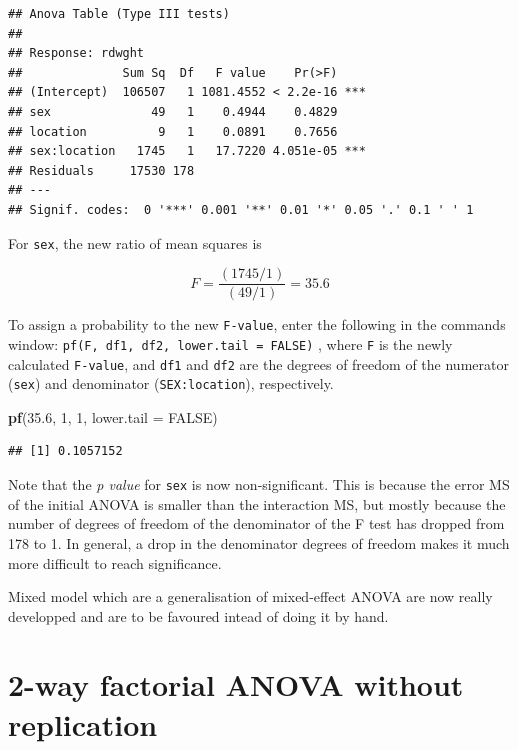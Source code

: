 \documentclass[
  12pt,
]{book}
\makeatletter
\newenvironment{Shaded}{\begin{snugshade}}{\end{snugshade}}
\newcommand{\DataTypeTok}[1]{\textcolor[rgb]{0.13,0.29,0.53}{#1}}
\newcommand{\DecValTok}[1]{\textcolor[rgb]{0.00,0.00,0.81}{#1}}
\newcommand{\FloatTok}[1]{\textcolor[rgb]{0.00,0.00,0.81}{#1}}
\newcommand{\KeywordTok}[1]{\textcolor[rgb]{0.13,0.29,0.53}{\textbf{#1}}}
\newcommand{\NormalTok}[1]{#1}
\newcommand{\OtherTok}[1]{\textcolor[rgb]{0.56,0.35,0.01}{#1}}
\newenvironment{kframe}{%
\medskip{}
\setlength{\fboxsep}{.8em}
\def\at@end@of@kframe{}%
\ifinner\ifhmode%
 \def\at@end@of@kframe{\end{minipage}}%
 \begin{minipage}{\columnwidth}%
\fi\fi%
\def\FrameCommand##1{\hskip\@totalleftmargin \hskip-\fboxsep
\colorbox{incolor}{##1}\hskip-\fboxsep
    \hskip-\linewidth \hskip-\@totalleftmargin \hskip\columnwidth}%
\MakeFramed {\advance\hsize-\width
  \@totalleftmargin\z@ \linewidth\hsize
  \@setminipage}}%
{\par\unskip\endMakeFramed%
\at@end@of@kframe}
\newenvironment{rmdblock}[1]
 {
 \begin{itemize}
 \renewcommand{\labelitemi}{
   \raisebox{-.7\height}[0pt][0pt]{
     {\setkeys{Gin}{width=3em,keepaspectratio}\texttt{[image: images/\#1]}}
   }
 }
 \begin{kframe}
 \setlength{\fboxsep}{1em}
 \item
 }
 {
 \end{kframe}
 \end{itemize}
 }
\newenvironment{rmdnote}
  {\begin{rmdblock}{note}}
  {\end{rmdblock}}
\makeatother
\begin{document}
\begin{verbatim}
## Anova Table (Type III tests)
## 
## Response: rdwght
##              Sum Sq  Df   F value    Pr(>F)    
## (Intercept)  106507   1 1081.4552 < 2.2e-16 ***
## sex              49   1    0.4944    0.4829    
## location          9   1    0.0891    0.7656    
## sex:location   1745   1   17.7220 4.051e-05 ***
## Residuals     17530 178                        
## ---
## Signif. codes:  0 '***' 0.001 '**' 0.01 '*' 0.05 '.' 0.1 ' ' 1
\end{verbatim}

For \texttt{sex}, the new ratio of mean squares is

\[F = \frac{(1745/1)}{(49/1)} = 35.6\]

To assign a probability to the new \texttt{F-value}, enter the following in the commands window: \texttt{pf(F,\ df1,\ df2,\ lower.tail\ =\ FALSE)} , where \texttt{F} is the newly calculated \texttt{F-value}, and \texttt{df1} and \texttt{df2} are the degrees of freedom of the numerator (\texttt{sex}) and denominator (\texttt{SEX:location}), respectively.

\begin{Shaded}
\begin{Highlighting}[]
\KeywordTok{pf}\NormalTok{(}\FloatTok{35.6}\NormalTok{, }\DecValTok{1}\NormalTok{, }\DecValTok{1}\NormalTok{, }\DataTypeTok{lower.tail =} \OtherTok{FALSE}\NormalTok{)}
\end{Highlighting}
\end{Shaded}

\begin{verbatim}
## [1] 0.1057152
\end{verbatim}

Note that the \emph{p value} for \texttt{sex} is now non-significant. This is because the error MS of the initial ANOVA is smaller than the interaction MS, but mostly because the number of degrees of freedom of the denominator of the F test has dropped from 178 to 1. In general, a drop in the denominator degrees of freedom makes it much more difficult to reach significance.

\begin{rmdnote}
Mixed model which are a generalisation of mixed-effect ANOVA are now really developped and are to be favoured intead of doing it by hand.
\end{rmdnote}

\hypertarget{way-factorial-anova-without-replication}{%
\section{2-way factorial ANOVA without replication}\label{way-factorial-anova-without-replication}}
\end{document}
